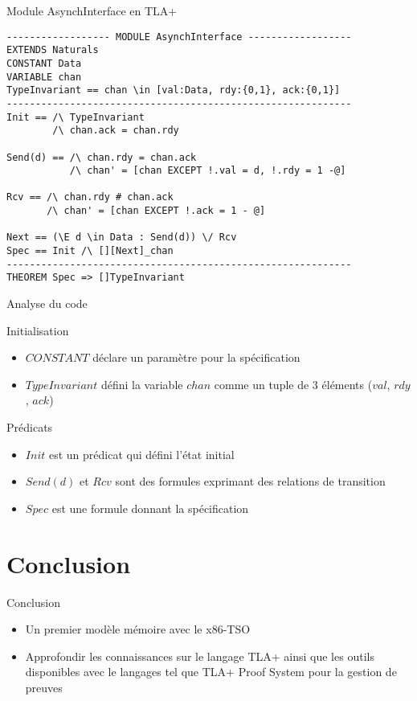 \documentclass{beamer}
\begin{document}
\begin{frame}[containsverbatim]{Module AsynchInterface en TLA+}
\begin{lstlisting}[frame=single, basicstyle=\scriptsize]
------------------ MODULE AsynchInterface ------------------
EXTENDS Naturals
CONSTANT Data
VARIABLE chan
TypeInvariant == chan \in [val:Data, rdy:{0,1}, ack:{0,1}]
------------------------------------------------------------
Init == /\ TypeInvariant
        /\ chan.ack = chan.rdy
        
Send(d) == /\ chan.rdy = chan.ack
           /\ chan' = [chan EXCEPT !.val = d, !.rdy = 1 -@]
           
Rcv == /\ chan.rdy # chan.ack
       /\ chan' = [chan EXCEPT !.ack = 1 - @]

Next == (\E d \in Data : Send(d)) \/ Rcv
Spec == Init /\ [][Next]_chan
------------------------------------------------------------
THEOREM Spec => []TypeInvariant       

\end{lstlisting}
\end{frame}

\begin{frame}{Analyse du code}
	\begin{block}{Initialisation}
		\begin{itemize}
			\item $CONSTANT$ déclare un paramètre pour la spécification
			\item $TypeInvariant$ défini la variable $chan$ comme un tuple de 3 éléments ($val$, $rdy$, $ack$)
		\end{itemize}	
	\end{block}		
	\begin{block}{Prédicats}
		\begin{itemize}
			\item $Init$ est un prédicat qui défini l'état initial
			\item $Send(d)$ et $Rcv$ sont des formules exprimant des relations de transition
			\item $Spec$ est une formule donnant la spécification
		\end{itemize}	
	\end{block}		
\end{frame}

\section{Conclusion}
\begin{frame}{Conclusion}
	\begin{itemize}
		\item Un premier modèle mémoire avec le x86-TSO
		\item Approfondir les connaissances sur le langage TLA+ ainsi que les outils disponibles avec le langages tel que TLA+ Proof System pour la gestion de preuves
	\end{itemize}
\end{frame}
\end{document}
